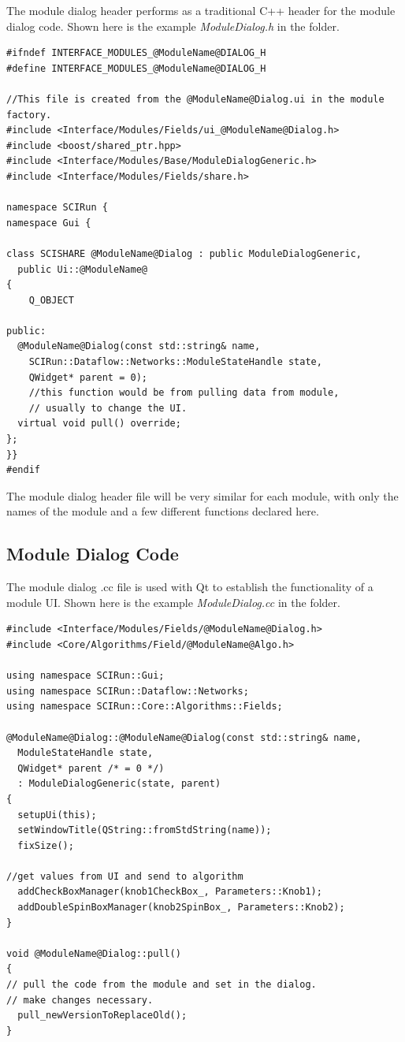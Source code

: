 \documentclass[fleqn,11pt,openany]{book}
\begin{document}
The module dialog header performs as a traditional C++ header for the module dialog code.  
Shown here is the example \emph{ModuleDialog.h} in the \emph{} folder.

\begin{verbatim}
#ifndef INTERFACE_MODULES_@ModuleName@DIALOG_H
#define INTERFACE_MODULES_@ModuleName@DIALOG_H

//This file is created from the @ModuleName@Dialog.ui in the module factory. 
#include <Interface/Modules/Fields/ui_@ModuleName@Dialog.h>
#include <boost/shared_ptr.hpp>
#include <Interface/Modules/Base/ModuleDialogGeneric.h>
#include <Interface/Modules/Fields/share.h>

namespace SCIRun {
namespace Gui {
  
class SCISHARE @ModuleName@Dialog : public ModuleDialogGeneric,
  public Ui::@ModuleName@
{
	Q_OBJECT
	
public:
  @ModuleName@Dialog(const std::string& name,
    SCIRun::Dataflow::Networks::ModuleStateHandle state,
    QWidget* parent = 0);
    //this function would be from pulling data from module, 
    // usually to change the UI. 
  virtual void pull() override;
};
}}
#endif
\end{verbatim}

The module dialog header file will be very similar for each module, with only the names of the module and a few different functions declared here.  


\subsection{Module Dialog Code}

The module dialog .cc file is used with Qt to establish the functionality of a module UI.  
Shown here is the example \emph{ModuleDialog.cc} in the \emph{} folder.
\begin{verbatim}
#include <Interface/Modules/Fields/@ModuleName@Dialog.h>
#include <Core/Algorithms/Field/@ModuleName@Algo.h>

using namespace SCIRun::Gui;
using namespace SCIRun::Dataflow::Networks;
using namespace SCIRun::Core::Algorithms::Fields;

@ModuleName@Dialog::@ModuleName@Dialog(const std::string& name, 
  ModuleStateHandle state,
  QWidget* parent /* = 0 */)
  : ModuleDialogGeneric(state, parent)
{
  setupUi(this);
  setWindowTitle(QString::fromStdString(name));
  fixSize();

//get values from UI and send to algorithm 
  addCheckBoxManager(knob1CheckBox_, Parameters::Knob1);
  addDoubleSpinBoxManager(knob2SpinBox_, Parameters::Knob2);
}

void @ModuleName@Dialog::pull()
{
// pull the code from the module and set in the dialog. 
// make changes necessary.
  pull_newVersionToReplaceOld();
}
\end{verbatim}
\end{document}
